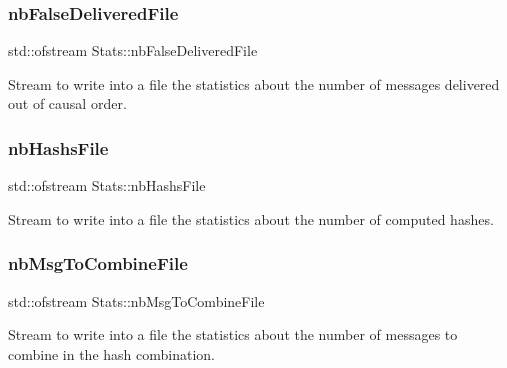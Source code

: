 \subsubsection{\texorpdfstring{nb\+False\+Delivered\+File}{nbFalseDeliveredFile}}
{\footnotesize\ttfamily std\+::ofstream Stats\+::nb\+False\+Delivered\+File\hspace{0.3cm}{\ttfamily [private]}}



Stream to write into a file the statistics about the number of messages delivered out of causal order. 

\mbox{\label{class_stats_a47e0155a0aa3c62997eba6ebcdf77975}} 
\subsubsection{\texorpdfstring{nb\+Hashs\+File}{nbHashsFile}}
{\footnotesize\ttfamily std\+::ofstream Stats\+::nb\+Hashs\+File\hspace{0.3cm}{\ttfamily [private]}}



Stream to write into a file the statistics about the number of computed hashes. 

\mbox{\label{class_stats_aca527547cfdce19906610acd9a3d26ca}} 
\subsubsection{\texorpdfstring{nb\+Msg\+To\+Combine\+File}{nbMsgToCombineFile}}
{\footnotesize\ttfamily std\+::ofstream Stats\+::nb\+Msg\+To\+Combine\+File\hspace{0.3cm}{\ttfamily [private]}}



Stream to write into a file the statistics about the number of messages to combine in the hash combination. 

\mbox{\label{class_stats_a3083f3da94481b94aaa8f53742834b97}} 
